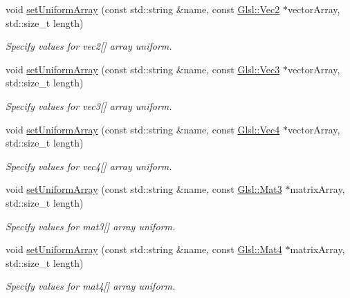 \begin{DoxyCompactItemize}
void \mbox{\hyperlink{classsf_1_1_shader_ab2e2eab45d9a091f3720c0879a5bb026}{set\+Uniform\+Array}} (const std\+::string \&name, const \mbox{\hyperlink{namespacesf_1_1_glsl_adeed356d346d87634b4c197a530e4edf}{Glsl\+::\+Vec2}} $\ast$vector\+Array, std\+::size\+\_\+t length)
\begin{DoxyCompactList}\small\item\em Specify values for {\ttfamily vec2}\mbox{[}\mbox{]} array uniform. \end{DoxyCompactList}\item 
void \mbox{\hyperlink{classsf_1_1_shader_aeae884292fed977bbea5039818f208e7}{set\+Uniform\+Array}} (const std\+::string \&name, const \mbox{\hyperlink{namespacesf_1_1_glsl_a9bdd0463b7cb5316244a082007bd50f0}{Glsl\+::\+Vec3}} $\ast$vector\+Array, std\+::size\+\_\+t length)
\begin{DoxyCompactList}\small\item\em Specify values for {\ttfamily vec3}\mbox{[}\mbox{]} array uniform. \end{DoxyCompactList}\item 
void \mbox{\hyperlink{classsf_1_1_shader_aa89ac1ea7918c9b1c2232df59affb7fa}{set\+Uniform\+Array}} (const std\+::string \&name, const \mbox{\hyperlink{structsf_1_1priv_1_1_vector4}{Glsl\+::\+Vec4}} $\ast$vector\+Array, std\+::size\+\_\+t length)
\begin{DoxyCompactList}\small\item\em Specify values for {\ttfamily vec4}\mbox{[}\mbox{]} array uniform. \end{DoxyCompactList}\item 
void \mbox{\hyperlink{classsf_1_1_shader_a69587701d347ba21d506197d0fb9f842}{set\+Uniform\+Array}} (const std\+::string \&name, const \mbox{\hyperlink{structsf_1_1priv_1_1_matrix}{Glsl\+::\+Mat3}} $\ast$matrix\+Array, std\+::size\+\_\+t length)
\begin{DoxyCompactList}\small\item\em Specify values for {\ttfamily mat3}\mbox{[}\mbox{]} array uniform. \end{DoxyCompactList}\item 
void \mbox{\hyperlink{classsf_1_1_shader_a066b0ba02e1c1bddc9e2571eca1156ab}{set\+Uniform\+Array}} (const std\+::string \&name, const \mbox{\hyperlink{structsf_1_1priv_1_1_matrix}{Glsl\+::\+Mat4}} $\ast$matrix\+Array, std\+::size\+\_\+t length)
\begin{DoxyCompactList}\small\item\em Specify values for {\ttfamily mat4}\mbox{[}\mbox{]} array uniform. \end{DoxyCompactList}\item 

\end{DoxyCompactItemize}
